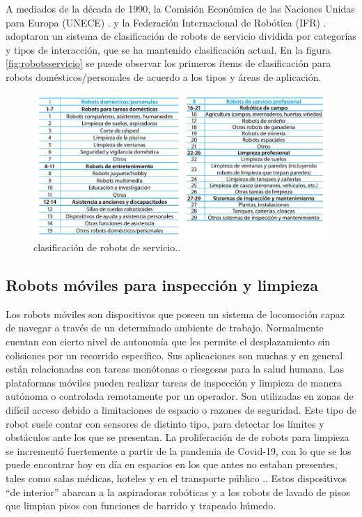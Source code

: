 A mediados de la década de 1990, la Comisión Económica de las Naciones Unidas para Europa (UNECE) .\citep{UNECE} y la Federación Internacional de Robótica (IFR) .\citep{IFR} adoptaron un sistema de clasificación de robots de servicio dividida por categorías y tipos de interacción, que se ha mantenido clasificación actual. En la  figura \ref{fig:robotsservicio} se puede observar los primeros ítems de clasificación para robots domésticos/personales de acuerdo a los tipos y áreas de aplicación.



\begin{figure}[h]
	\centering
	\includegraphics[width=\textwidth]{./Figures/clasificacion.png}
	\caption{clasificación de robots de servicio.\protect\footnotemark.}
	\label{fig:clasificacion}
\end{figure}




\subsection{Robots móviles para inspección y limpieza}

Los robots móviles son dispositivos que poseen un sistema de locomoción capaz de navegar a través de un determinado ambiente de trabajo. Normalmente cuentan con cierto nivel de autonomía que les permite el desplazamiento sin colisiones por un recorrido específico. Sus aplicaciones son muchas y en general  están relacionadas con tareas monótonas o riesgosas para la salud humana.
Las plataformas móviles pueden realizar tareas de inspección y limpieza de manera autónoma o controlada remotamente por un operador. Son utilizadas en zonas de difícil acceso debido a limitaciones de espacio o razones de seguridad.  
Este tipo de robot suele contar con sensores de distinto tipo, para detectar los límites y obstáculos ante los que se presentan. 
La proliferación de de robots para limpieza se incrementó fuertemente a partir de la pandemia de Covid-19, con lo que se los puede encontrar hoy en día en espacios en los que antes no estaban presentes, tales como salas médicas,  hoteles y en el transporte público  .\citep{Cleaning}. Estos dispositivos “de interior” abarcan a la aspiradoras robóticas y a los robots de lavado de pisos que limpian pisos con funciones de barrido y trapeado húmedo. 

